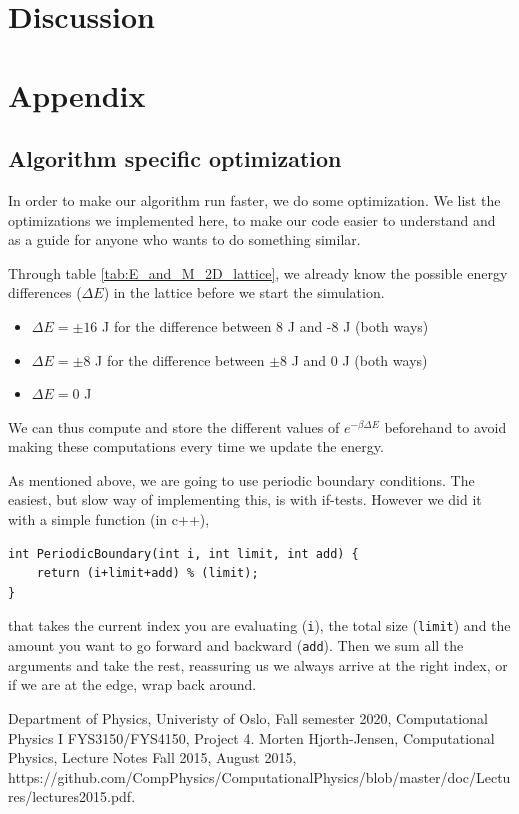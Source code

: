 \documentclass[reprint, english,notitlepage,nofootinbib]{revtex4-1}  %
\begin{document}
\section{Discussion}

\section{Appendix}
\subsection{Algorithm specific optimization}

In order to make our algorithm run faster, we do some optimization. We list the optimizations we implemented here, to make our code easier to understand and as a guide for anyone who wants to do something similar.

Through table \ref{tab:E_and_M_2D_lattice}, we already know the possible energy differences ($\Delta E$) in the lattice before we start the simulation. 
\begin{itemize}
	\item $\Delta E = \pm 16$ J for the difference between 8 J and -8 J (both ways)
	\item $\Delta E = \pm 8$ J for the difference between $\pm 8$ J and 0 J (both ways)
	\item $\Delta E = 0$ J
\end{itemize}
We can thus compute and store the different values of $e^{- \beta \Delta E}$ beforehand to avoid making these computations every time we update the energy.

As mentioned above, we are going to use periodic boundary conditions. The easiest, but slow way of implementing this, is with if-tests. However we did it with a simple function (in c++),
\begin{lstlisting}
int PeriodicBoundary(int i, int limit, int add) { 
	return (i+limit+add) % (limit);
}
\end{lstlisting}
that takes the current index you are evaluating (\texttt{i}), the total size (\texttt{limit}) and the amount you want to go forward and backward (\texttt{add}). Then we sum all the arguments and take the rest, reassuring us we always arrive at the right index, or if we are at the edge, wrap back around.

\onecolumngrid
\vspace{1cm} %

\begin{thebibliography}{}
 Department of Physics, Univeristy of Oslo, Fall semester 2020, Computational Physics I FYS3150/FYS4150, Project 4.
 Morten Hjorth-Jensen, Computational Physics, Lecture Notes Fall 2015, August 2015, https://github.com/CompPhysics/ComputationalPhysics/blob/master/doc/Lectures/lectures2015.pdf.

\end{thebibliography}
\end{document}
